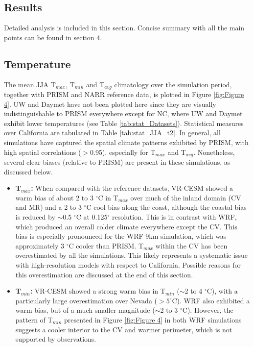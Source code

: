 \documentclass[draft,ms]{agutex}   %
\begin{document}
\begin{article}
\section{Results}

Detailed analysis is included in this section. Concise summary with all the main points can be found in section 4.

\subsection{Temperature}


The mean JJA T$_{max}$, T$_{min}$ and T$_{avg}$ climatology over the simulation period, together with PRISM and NARR reference data, is plotted in Figure \ref{fig:Figure 4}. UW and Daymet have not been plotted here since they are visually indistinguishable to PRISM everywhere except for NC, where UW and Daymet exhibit lower temperatures (see Table \ref{tab:stat_Datasets}).  Statistical measures over California are tabulated in Table \ref{tab:stat_JJA_t2}. In general, all simulations have captured the spatial climate patterns exhibited by PRISM, with high spatial correlations ($>$0.95), especially for T$_{max}$ and T$_{avg}$.  Nonetheless, several clear biases (relative to PRISM) are present in these simulations, as discussed below.

\begin{itemize}
\item{} \textbf{T$_{max}$:}  When compared with the reference datasets, VR-CESM showed a warm bias of about 2 to 3 $^\circ$C in T$_{max}$ over much of the inland domain (CV and MR) and a 2 to 3 $^\circ$C cool bias along the coast, although the coastal bias is reduced by $\sim$0.5 $^\circ$C at 0.125$^\circ$ resolution. This is in contrast with WRF, which produced an overall colder climate everywhere except the CV.  This bias is especially pronounced for the WRF 9km simulation, which was approximately 3 $^\circ$C cooler than PRISM. T$_{max}$ within the CV has been overestimated by all the simulations. This likely represents a systematic issue with high-resolution models with respect to California.  Possible reasons for this overestimation are discussed at the end of this section.


\item{} \textbf{T$_{min}$:}  VR-CESM showed a strong warm bias in T$_{min}$ ($\sim$2 to 4 $^\circ$C), with a particularly large overestimation over Nevada ($> 5 ^\circ$C). WRF also exhibited a warm bias, but of a much smaller magnitude ($\sim$2 to 3 $^\circ$C). However, the pattern of T$_{min}$ presented in Figure \ref{fig:Figure 4} in both WRF simulations suggests a cooler interior to the CV and warmer perimeter, which is not supported by observations.


\end{itemize}
\end{article}
\end{document}
